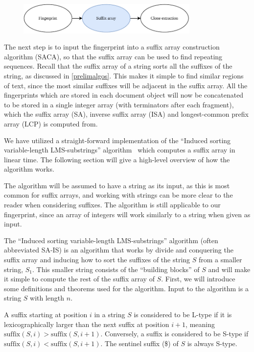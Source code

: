\begin{figure}[H]
    \begin{center}
        \includegraphics[width=0.8\textwidth]{figures/phases/phases_suffix.drawio.pdf}
    \end{center}
\end{figure}

The next step is to input the fingerprint into a suffix array construction algorithm
(SACA), so that the suffix array can be used to find repeating sequences. Recall that the
suffix array of a string sorts all the suffixes of the string, as discussed in
\cref{prelimalgos}. This makes it simple to find similar regions of text, since the most
similar suffixes will be adjacent in the suffix array. All the fingerprints which are
stored in each document object will now be concatenated to be stored in a single integer
array (with terminators after each fragment), which the suffix array (SA), inverse suffix
array (ISA) and longest-common prefix array (LCP) is computed from.

We have utilized a straight-forward implementation of the ``Induced sorting
variable-length LMS-substrings'' algorithm~\cite{LinearTimeSuffixArraySAIS} which computes
a suffix array in linear time. The following section will give a high-level overview of
how the algorithm works. 

The algorithm will be assumed to have a string as its input, as this is most common for
suffix arrays, and working with strings can be more clear to the reader when considering
suffixes. The algorithm is still applicable to our fingerprint, since an array of integers
will work similarly to a string when given as input.

The ``Induced sorting variable-length LMS-substrings'' algorithm (often abbreviated SA-IS)
is an algorithm that works by divide and conquering the suffix array and inducing how to
sort the suffixes of the string $S$ from a smaller string, $S_1$. This smaller string
consists of the ``building blocks'' of $S$ and will make it simple to compute the rest of
the suffix array of $S$. First, we will introduce some definitions and theorems used for
the algorithm. Input to the algorithm is a string $S$ with length $n$. 

\begin{definition} A suffix starting at position $i$ in a
    string $S$ is considered to be L-type if it is lexicographically larger than the next
    suffix at position $i + 1$, meaning $\mathrm{suffix}(S, i) > \mathrm{suffix}(S, i+1)$.
    Conversely, a suffix is considered to be S-type if $\mathrm{suffix}(S, i) <
\mathrm{suffix}(S, i+1)$. The sentinel suffix (\$) of $S$ is always S-type.
\end{definition}




